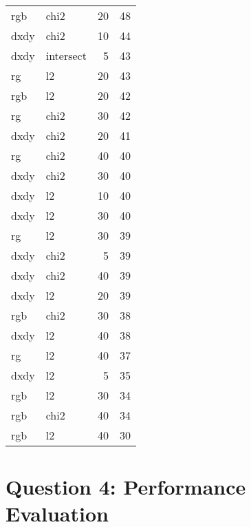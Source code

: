 \documentclass{article}
\begin{document}
\begin{center}
\begin{tabular}{llrr}
      rgb &       chi2 &        20 &                       48 \\
     dxdy &       chi2 &        10 &                       44 \\
     dxdy &  intersect &         5 &                       43 \\
       rg &         l2 &        20 &                       43 \\
      rgb &         l2 &        20 &                       42 \\
       rg &       chi2 &        30 &                       42 \\
     dxdy &       chi2 &        20 &                       41 \\
       rg &       chi2 &        40 &                       40 \\
     dxdy &       chi2 &        30 &                       40 \\
     dxdy &         l2 &        10 &                       40 \\
     dxdy &         l2 &        30 &                       40 \\
       rg &         l2 &        30 &                       39 \\
     dxdy &       chi2 &         5 &                       39 \\
     dxdy &       chi2 &        40 &                       39 \\
     dxdy &         l2 &        20 &                       39 \\
      rgb &       chi2 &        30 &                       38 \\
     dxdy &         l2 &        40 &                       38 \\
       rg &         l2 &        40 &                       37 \\
     dxdy &         l2 &         5 &                       35 \\
      rgb &         l2 &        30 &                       34 \\
      rgb &       chi2 &        40 &                       34 \\
      rgb &         l2 &        40 &                       30 \\
\bottomrule
\end{tabular}
\end{center}

\newpage
\section{Question 4: Performance Evaluation }
\end{document}
